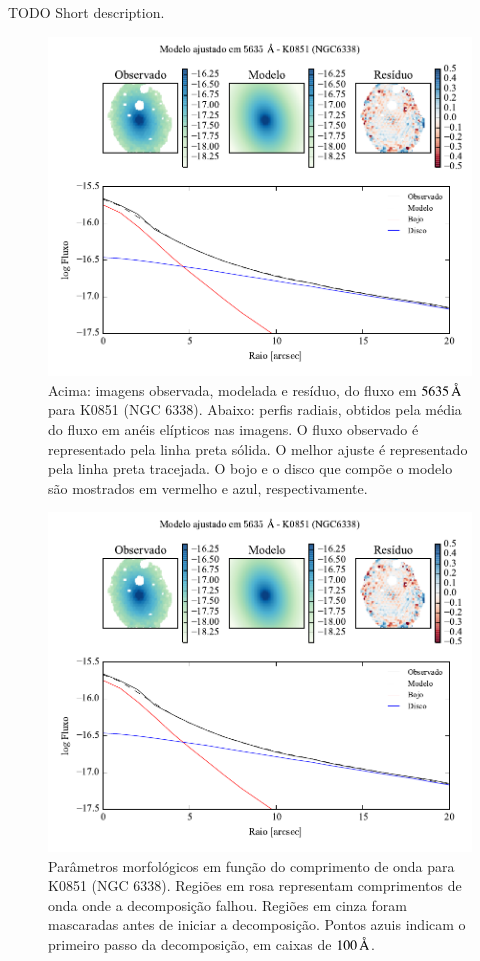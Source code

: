 TODO Short description.

\begin{figure}
	\includegraphics[page=1]{figuras-decomp/K0851_sample006a}
	\caption[Ajuste morfológico em $5635\,\angstrom$ de K0851 (NGC 6338)]
	{Acima: imagens observada, modelada e resíduo, do fluxo em $5635\,\angstrom$
	para K0851 (NGC 6338). Abaixo: perfis radiais, obtidos pela média do fluxo em
	anéis elípticos nas imagens. O fluxo observado é representado pela linha preta
	sólida. O melhor ajuste é representado pela linha preta tracejada. O bojo e o
	disco que compõe o modelo são mostrados em vermelho e azul, respectivamente.}
	\label{fig:decompRadprof:K0851}
\end{figure}

\begin{figure}
	\includegraphics[page=2]{figuras-decomp/K0851_sample006a}
	\caption[Parâmetros morfológicos em função do comprimento de onda de K0851
	(NGC 6338)]
	{Parâmetros morfológicos em função do comprimento de onda para
	K0851 (NGC 6338). Regiões em rosa representam comprimentos de onda onde a
	decomposição falhou. Regiões em cinza foram mascaradas antes de iniciar a
	decomposição. Pontos azuis indicam o primeiro passo da decomposição, em caixas
	de $100\,\text{\normalfont\AA}$.}
	\label{fig:decompParams:K0851}
\end{figure}

